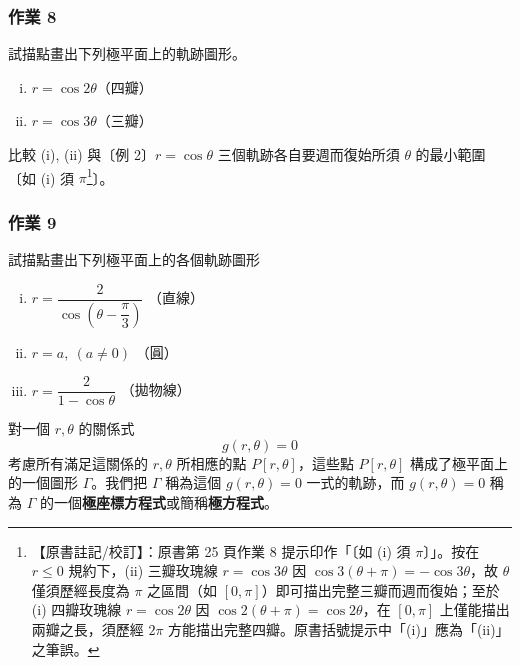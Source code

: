 \medskip
\subsubsection*{作業 8}
試描點畫出下列極平面上的軌跡圖形。
\begin{enumerate}[(i)]
  \item $r = \cos 2\theta$（四瓣）
  \item $r = \cos 3\theta$（三瓣）
\end{enumerate}
比較 (i), (ii) 與〔例 2〕$r = \cos\theta$ 三個軌跡各自要週而復始所須 $\theta$ 的最小範圍〔如 (i) 須 $\pi$\label{note:b5s-ch1-p25-hw8}\footnote{【原書註記/校訂】：原書第 25 頁作業 8 提示印作「〔如 (i) 須 $\pi$〕」。按在 $r \le 0$ 規約下，(ii) 三瓣玫瑰線 $r = \cos 3\theta$ 因 $\cos 3(\theta + \pi) = -\cos 3\theta$，故 $\theta$ 僅須歷經長度為 $\pi$ 之區間（如 $[0, \pi]$）即可描出完整三瓣而週而復始；至於 (i) 四瓣玫瑰線 $r = \cos 2\theta$ 因 $\cos 2(\theta + \pi) = \cos 2\theta$，在 $[0, \pi]$ 上僅能描出兩瓣之長，須歷經 $2\pi$ 方能描出完整四瓣。原書括號提示中「(i)」應為「(ii)」之筆誤。}〕。

\medskip
\subsubsection*{作業 9}
試描點畫出下列極平面上的各個軌跡圖形
\begin{enumerate}[(i)]
  \item $r = \dfrac{2}{\cos\left(\theta - \dfrac{\pi}{3}\right)}$ \qquad （直線）
  \item $r = a, \ (a \neq 0)$ \qquad （圓）
  \item $r = \dfrac{2}{1 - \cos\theta}$ \qquad （拋物線）
\end{enumerate}

\medskip
\begin{definition*}
對一個 $r, \theta$ 的關係式
\begin{equation}\label{eq:b5s-1-3-4}
  g(r, \theta) = 0 \tag{4}
\end{equation}
考慮所有滿足這關係的 $r, \theta$ 所相應的點 $P[r, \theta]$，這些點 $P[r, \theta]$ 構成了極平面上的一個圖形 $\Gamma$。我們把 $\Gamma$ 稱為這個 $g(r, \theta) = 0$ 一式的軌跡，而 $g(r, \theta) = 0$ 稱為 $\Gamma$ 的一個\textbf{極座標方程式}或簡稱\textbf{極方程式}。
\end{definition*}

\medskip
